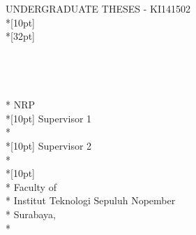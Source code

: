 \newpage
	\sffamily
	\thispagestyle{empty}
	{\noindent UNDERGRADUATE THESES - KI141502 } \\*[10pt]
	{\large\textbf{\MakeUppercase{\judulEnglish}}} \\*[32pt]
	\\
	\\
	\\
	\\
	\MakeUppercase{\penulis} \\*
	NRP \nrp \\*[10pt]
	Supervisor 1 \\*
	\pembimbingSatu \\*[10pt]
	Supervisor 2 \\*
	\pembimbingDua \\*[10pt]
	\MakeUppercase{\jurusanEnglish} \\*
	Faculty of \fakultasEnglish \\*
	Institut Teknologi Sepuluh Nopember \\*
	Surabaya, \tahun \\*
	\rmfamily
	\normalsize
	\restoregeometry
	\color{black}
	\cleardoublepage
